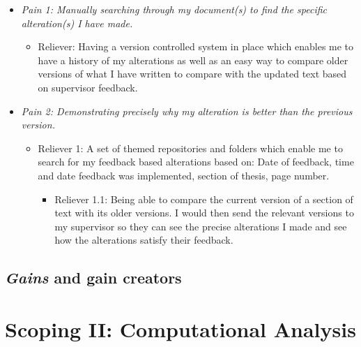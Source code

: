 \documentclass{article}
\begin{document}
\begin{itemize}
    \item \textit{Pain 1: Manually searching through my document(s) to find the specific alteration(s) I have made.} 
    \begin{itemize}
        \item  Reliever: Having a version controlled system in place which enables me to have a history of my alterations as well as an easy way to compare older versions of what I have written to compare with the updated text based on supervisor feedback. 
    \end{itemize}
    \item \textit{Pain 2: Demonstrating precisely why my alteration is better than the previous version.} 
    \begin{itemize}
        \item  Reliever 1: A set of themed repositories and folders which enable me to search for my feedback based alterations based on: Date of feedback, time and date feedback was implemented, section of thesis, page number.
        \begin{itemize}
        \item Reliever 1.1: Being able to compare the current version of a section of text with its older versions. I would then send the relevant versions to my supervisor so they can see the precise alterations I made and see how the alterations satisfy their feedback.
        \end{itemize}
    \end{itemize}
\end{itemize}

\subsection{\textit {Gains} and gain creators}

\section{Scoping II: Computational Analysis}
\end{document}
